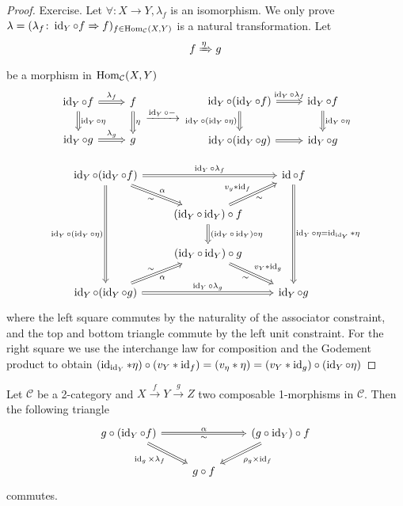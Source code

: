 \begin{proof}
	Exercise.
	Let $ \forall \colon X \to Y, \lambda_f $ is an isomorphism.
	We only prove $ \lambda = ( \lambda_f \colon \operatorname{id}_Y \circ f \Rightarrow f )_{ f \in \operatorname{Hom}_{ \mathcal{C } } ( X , Y ) }$ is a natural transformation.
	Let 
	\[
		f \xRightarrow{\eta} g
	\]
	be a morphism in $ \operatorname{Hom}_{ \mathcal{ C } } ( X, Y )$ 
	\[
	\begin{tikzcd}
		\id_Y \circ f 
		\ar[d, Rightarrow, "\id_Y \circ \eta"]
		\ar[r, Rightarrow, "\lambda_f"]
		&
		f
		\ar[d, Rightarrow, "\eta"]
		\\
		\id_Y \circ g 
		\ar[r, Rightarrow, "\lambda_g"]
		& 
		g
	\end{tikzcd}
	\xrightarrow{ \id_Y \circ - }
	\begin{tikzcd}
		\id_Y \circ ( \id_Y \circ f ) 
		\ar[r,Rightarrow, "\id_Y \circ \lambda_f"]
		\ar[d, Rightarrow, "\id_Y \circ ( \id_Y \circ \eta )"']
		&
		\id_Y \circ f
		\ar[d, Rightarrow, " \id_Y \circ \eta"]
		\\
		\id_Y \circ ( \id_Y \circ g )
		\ar[r, Rightarrow]
		&
		\id_Y \circ g
	\end{tikzcd}
	\]
	
	\[
	\begin{tikzcd}
		\id_Y \circ ( \id_Y \circ f )
		\ar[ddd,Rightarrow, " \id_Y \circ ( \id_Y \circ \eta )"']
		\ar[rr, Rightarrow, " \id_Y \circ\lambda_f" ]
		\ar[rd, Rightarrow, "\sim"', "\alpha"]
		&&
		\id \circ f 
		\ar[ddd,Rightarrow, " \id_Y \circ \eta = \id_{ \id_Y } * \eta "]
		\\
		&
		(\id_Y \circ \id_Y ) \circ f 
		\ar[ru,Rightarrow, " v_y * \id_f","\sim"']
		\ar[d, Rightarrow, " ( \id_Y \circ \id_Y) \circ \eta" ]
		\\
		&
		(\id_Y \circ \id_Y ) \circ g
		\ar[rd, Rightarrow, "v_Y * \id_g", "\sim"']
		\\
		\id_Y \circ ( \id_Y \circ g ) 
		\ar[ru, Rightarrow, "\sim", " \alpha"']
		\ar[rr, Rightarrow, " \id_Y \circ \lambda_g"]	
		&&
		\id_Y \circ g
	\end{tikzcd}
	\]
	where the left square commutes by the naturality of the associator constraint, and the top and bottom triangle commute by the left unit constraint.
	For the right square we use the interchange law for composition and the Godement product to obtain $ ( \operatorname{id}_{\operatorname{id}_Y} * \eta ) \circ ( v_Y * \operatorname{id}_f ) = ( v_\eta * \eta ) = ( v_Y * \operatorname{id}_g ) \circ ( \operatorname{id}_Y \circ \eta )$
\end{proof}

\begin{prop}
	Let $ \mathcal{ C } $ be a 2-category and $ X \xrightarrow{f} Y \xrightarrow{g} Z $ two composable 1-morphisms in $\mathcal{ C }$.
	Then the following triangle 
	\[
	\begin{tikzcd}
		g \circ ( \id_Y \circ f)
		\ar[rr, Rightarrow, "\alpha", "\sim"']
		\ar[rd, Rightarrow,"\id_g \times \lambda_f"']
		&&
		( g \circ \id_Y ) \circ f 
		\ar[dl, Rightarrow, " \rho_g \times \id_f"]
		\\
		&
		g \circ f 
	\end{tikzcd}
	\]
	commutes.
\end{prop}

